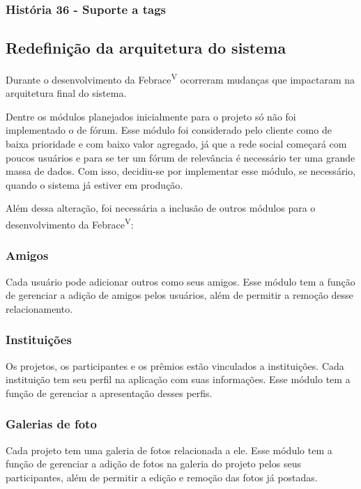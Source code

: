     \subsubsection{História 36 - Suporte a tags}


  \subsection{Redefinição da arquitetura do sistema}

    Durante o desenvolvimento da Febrace\textsuperscript{V} ocorreram mudanças que impactaram na arquitetura final do sistema.
    
    Dentre os módulos planejados inicialmente para o projeto só não foi implementado o de fórum. Esse módulo foi considerado pelo cliente como de baixa prioridade e com baixo valor agregado, já que a rede social começará com poucos usuários e para se ter um fórum de relevância é necessário ter uma grande massa de dados. Com isso, decidiu-se por implementar esse módulo, se necessário, quando o sistema já estiver em produção.

    Além dessa alteração, foi necessária a inclusão de outros módulos para o desenvolvimento da Febrace\textsuperscript{V}:

    \subsubsection{Amigos}
      Cada usuário pode adicionar outros como seus amigos. Esse módulo tem a função de gerenciar a adição de amigos pelos usuários, além de permitir a remoção desse relacionamento.

    \subsubsection{Instituições}
        Os projetos, os participantes e os prêmios estão vinculados a instituições. Cada instituição tem seu perfil na aplicação com suas informações. Esse módulo tem a função de gerenciar a apresentação desses perfis.

    \subsubsection{Galerias de foto}
      Cada projeto tem uma galeria de fotos relacionada a ele. Esse módulo tem a função de gerenciar a adição de fotos na galeria do projeto pelos seus participantes, além de permitir a edição e remoção das fotos já postadas.

